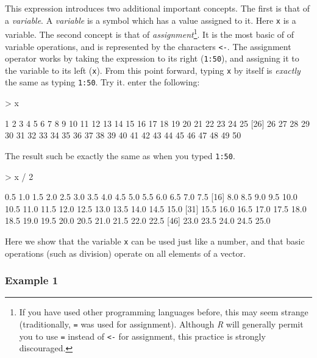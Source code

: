 \documentclass[10pt,letterpaper]{article}
\newenvironment{Schunk}{}{}
\begin{document}
This expression introduces two additional important concepts.  The first is that of a \emph{variable}.  A \emph{variable} is a symbol which has a value assigned to it.  Here \texttt{x} is a variable.  The second concept is that of \emph{assignment}\footnote{If you have used other programming languages before, this may seem strange (traditionally, \texttt{=} was used for assignment).  Although \emph{R} will generally permit you to use \texttt{=} instead of \texttt{<-} for assignment, this practice is strongly discouraged.}.  It is the most basic of of variable operations, and is represented by the characters \texttt{<-}.  The assignment operator works by taking the expression to its right (\texttt{1:50}), and assigning it to the variable to its left (\texttt{x}).  From this point forward, typing \texttt{x} by itself is \emph{exactly} the same as typing \texttt{1:50}.  Try it.  enter the following:
\begin{Schunk}
\begin{Sinput}
> x
\end{Sinput}
\begin{Soutput}
 [1]  1  2  3  4  5  6  7  8  9 10 11 12 13 14 15 16 17 18 19 20 21 22 23 24 25
[26] 26 27 28 29 30 31 32 33 34 35 36 37 38 39 40 41 42 43 44 45 46 47 48 49 50
\end{Soutput}
\end{Schunk}
The result such be exactly the same as when you typed \texttt{1:50}.

\begin{Schunk}
\begin{Sinput}
> x / 2
\end{Sinput}
\begin{Soutput}
 [1]  0.5  1.0  1.5  2.0  2.5  3.0  3.5  4.0  4.5  5.0  5.5  6.0  6.5  7.0  7.5
[16]  8.0  8.5  9.0  9.5 10.0 10.5 11.0 11.5 12.0 12.5 13.0 13.5 14.0 14.5 15.0
[31] 15.5 16.0 16.5 17.0 17.5 18.0 18.5 19.0 19.5 20.0 20.5 21.0 21.5 22.0 22.5
[46] 23.0 23.5 24.0 24.5 25.0
\end{Soutput}
\end{Schunk}

Here we show that the variable \texttt{x} can be used just like a number, and that basic operations (such as division) operate on all elements of a vector.

\subsubsection{Example 1} %
\label{ssub:example_1}
\end{document}

